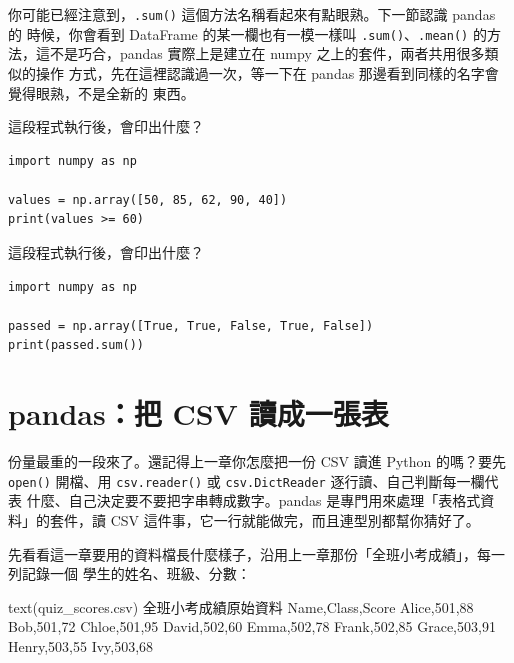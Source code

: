 

你可能已經注意到，\texttt{.sum()} 這個方法名稱看起來有點眼熟。下一節認識 pandas 的
時候，你會看到 DataFrame 的某一欄也有一模一樣叫 \texttt{.sum()}、\texttt{.mean()}
的方法，這不是巧合，pandas 實際上是建立在 numpy 之上的套件，兩者共用很多類似的操作
方式，先在這裡認識過一次，等一下在 pandas 那邊看到同樣的名字會覺得眼熟，不是全新的
東西。

\begin{drills}[label=drills:numpy-boolean]
\item 這段程式執行後，會印出什麼？
\begin{verbatim}
import numpy as np

values = np.array([50, 85, 62, 90, 40])
print(values >= 60)
\end{verbatim}
\item 這段程式執行後，會印出什麼？
\begin{verbatim}
import numpy as np

passed = np.array([True, True, False, True, False])
print(passed.sum())
\end{verbatim}
\end{drills}

\section{pandas：把 CSV 讀成一張表}
\label{sec:pandas-read-select}

份量最重的一段來了。還記得上一章你怎麼把一份 CSV 讀進 Python 的嗎？要先 \texttt{open()}
開檔、用 \texttt{csv.reader()} 或 \texttt{csv.DictReader} 逐行讀、自己判斷每一欄代表
什麼、自己決定要不要把字串轉成數字。pandas 是專門用來處理「表格式資料」的套件，讀 CSV
這件事，它一行就能做完，而且連型別都幫你猜好了。

先看看這一章要用的資料檔長什麼樣子，沿用上一章那份「全班小考成績」，每一列記錄一個
學生的姓名、班級、分數：

\begin{example}{text}{(quiz\_scores.csv) 全班小考成績原始資料}
Name,Class,Score
Alice,501,88
Bob,501,72
Chloe,501,95
David,502,60
Emma,502,78
Frank,502,85
Grace,503,91
Henry,503,55
Ivy,503,68
\end{example}

